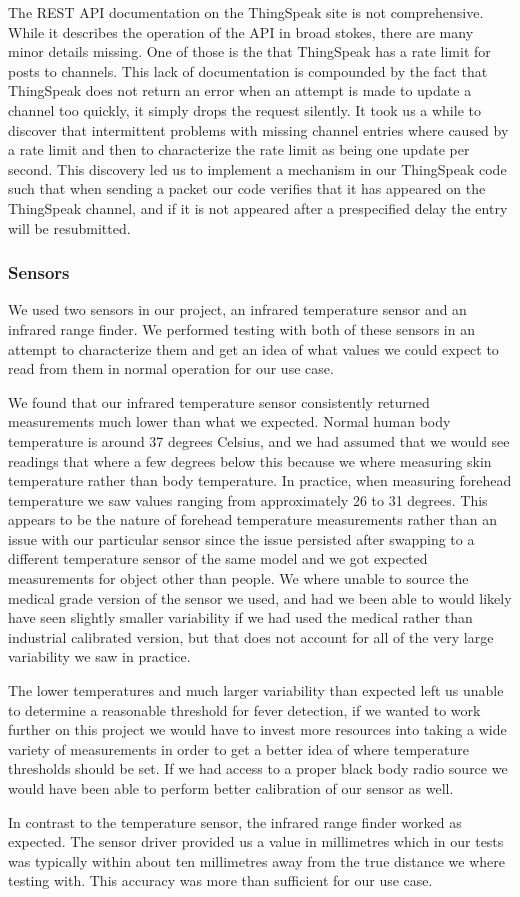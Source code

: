 The REST API documentation on the ThingSpeak site is not comprehensive. While it
describes the operation of the API in broad stokes, there are many minor details
missing. One of those is the that ThingSpeak has a rate limit for posts to
channels. This lack of documentation is compounded by the fact that ThingSpeak
does not return an error when an attempt is made to update a channel too
quickly, it simply drops the request silently. It took us a while to discover
that intermittent problems with missing channel entries where caused by a rate
limit and then to characterize the rate limit as being one update per second.
This discovery led us to implement a mechanism in our ThingSpeak code such that
when sending a packet our code verifies that it has appeared on the ThingSpeak
channel, and if it is not appeared after a prespecified delay the entry will
be resubmitted.

\subsubsection{Sensors}

We used two sensors in our project, an infrared temperature sensor and an
infrared range finder. We performed testing with both of these sensors in an
attempt to characterize them and get an idea of what values we could expect to
read from them in normal operation for our use case.

We found that our infrared temperature sensor consistently returned measurements
much lower than what we expected. Normal human body temperature is around 37
degrees Celsius, and we had assumed that we would see readings that where a few
degrees below this because we where measuring skin temperature rather than
body temperature. In practice, when measuring forehead temperature we saw values
ranging from approximately 26 to 31 degrees. This appears to be the nature of
forehead temperature measurements rather than an issue with our particular sensor
since the issue persisted after swapping to a different temperature sensor of the
same model and we got expected measurements for object other than people. We
where unable to source the medical grade version of the sensor we used, and had
we been able to would likely have seen slightly smaller variability if we had
used the medical rather than industrial calibrated version, but that does not
account for all of the very large variability we saw in practice.

The lower temperatures and much larger variability than expected left us unable
to determine a reasonable threshold for fever detection, if we wanted to work
further on this project we would have to invest more resources into taking a
wide variety of measurements in order to get a better idea of where temperature
thresholds should be set. If we had access to a proper black body radio source
we would have been able to perform better calibration of our sensor as well.

In contrast to the temperature sensor, the infrared range finder worked as
expected. The sensor driver provided us a value in millimetres which in our
tests was typically within about ten millimetres away from the true distance we
where testing with. This accuracy was more than sufficient for our use case.


